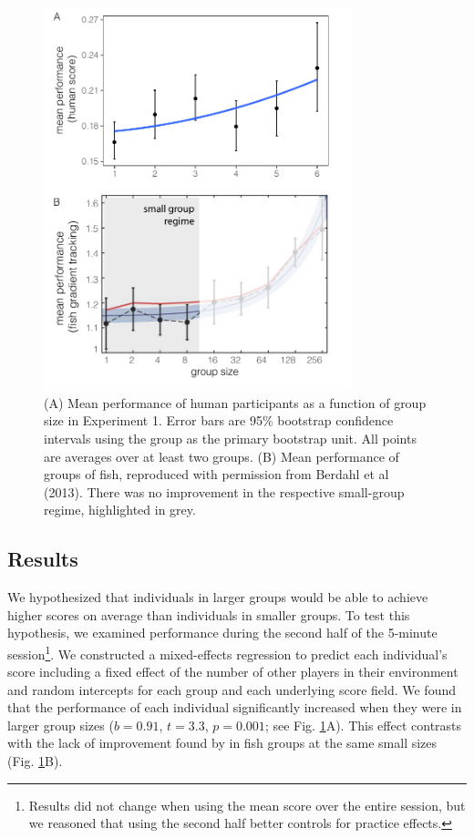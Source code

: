\documentclass[12pt,letterpaper]{article}
\begin{document}
\begin{figure}[t!]
  \centering
  \includegraphics[width=0.8\textwidth]{./figures/exp1_combined.pdf}
  \caption{(A) Mean performance of human participants as a function of group size in Experiment 1.  Error bars are 95\% bootstrap confidence intervals using the group as the primary bootstrap unit.  All points are averages over at least two groups. (B) Mean performance of groups of fish, reproduced with permission from Berdahl et al (2013). There was no improvement in the respective small-group regime, highlighted in grey.}
  \label{fig:exp1_performance}
\end{figure}

\subsection{Results}

We hypothesized that individuals in larger groups would be able to achieve higher scores on average than individuals in smaller groups. 
To test this hypothesis, we examined performance during the second half of the 5-minute session\footnote{Results did not change when using the mean score over the entire session, but we reasoned that using the second half better controls for practice effects.}. 
We constructed a mixed-effects regression to predict each individual's score including a fixed effect of the number of other players in their environment and random intercepts for each group and each underlying score field.
We found that the performance of each individual significantly increased when they were in larger group sizes ($b = 0.91$, $t = 3.3$, $p = 0.001$; see Fig. \ref{fig:exp1_performance}A). 
This effect contrasts with the lack of improvement found by  in fish groups at the same small sizes (Fig. \ref{fig:exp1_performance}B).
\end{document}
